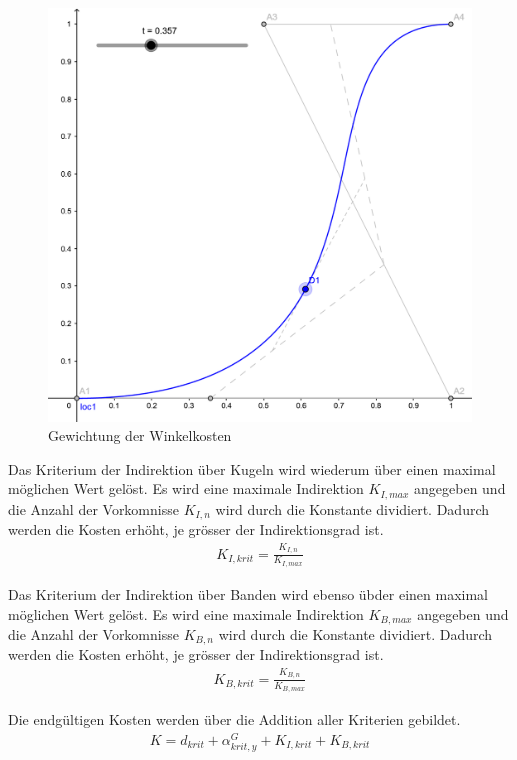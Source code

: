 \begin{figure}[h!]
    \begin{center}
        \includegraphics[width=0.4\linewidth]{../common/03_billiard_ai/resources/30_suchbaum_gewichtung_winkelkosten.png}
    \end{center}
    \caption{Gewichtung der Winkelkosten}
    \label{fig:suche_knoten_gewichtung_winkelkosten}
\end{figure}

Das Kriterium der Indirektion über Kugeln wird wiederum über einen maximal möglichen Wert gelöst.
Es wird eine maximale Indirektion $K_{I,max}$ angegeben und die Anzahl der Vorkomnisse ${K_{I,n}}$ wird durch die
Konstante dividiert. Dadurch werden die Kosten erhöht, je grösser der Indirektionsgrad ist.
\begin{align}
    K_{I,krit} = \frac{K_{I,n}}{K_{I,max}}
\end{align}

Das Kriterium der Indirektion über Banden wird ebenso übder einen maximal möglichen Wert gelöst.
Es wird eine maximale Indirektion $K_{B,max}$ angegeben und die Anzahl der Vorkomnisse ${K_{B,n}}$ wird durch die
Konstante dividiert. Dadurch werden die Kosten erhöht, je grösser der Indirektionsgrad ist.
\begin{align}
    K_{B,krit} = \frac{K_{B,n}}{K_{B,max}}
\end{align}

Die endgültigen Kosten werden über die Addition aller Kriterien gebildet.
\begin{align}
    K = d_{krit} + \alpha^G_{krit, y} + K_{I,krit} + K_{B,krit}
\end{align}


